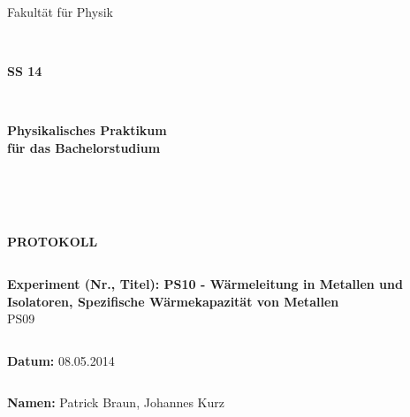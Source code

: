 \documentclass[12pt,a4paper]{article}
\begin{document}
\thispagestyle{empty}
			\begin{center}
			\Large{Fakultät für Physik}\\
			\end{center}
\begin{verbatim}


\end{verbatim}
			\begin{center}
			\textbf{\LARGE SS 14}
			\end{center}
\begin{verbatim}


\end{verbatim}
			\begin{center}
			\textbf{\LARGE{Physikalisches Praktikum\\ für das Bachelorstudium}}
			\end{center}
\begin{verbatim}




\end{verbatim}

			\begin{center}
			\textbf{\LARGE{PROTOKOLL}}
			\end{center}
			
\begin{verbatim}

\end{verbatim}

			\begin{flushleft}
			\textbf{\Large{Experiment (Nr., Titel): PS10 - Wärmeleitung in Metallen und Isolatoren, Spezifische Wärmekapazität von Metallen}}\\
			\LARGE{PS09 }	
			\end{flushleft}

\begin{verbatim}

\end{verbatim}	
			\begin{flushleft}
			\textbf{\Large{Datum:}} \Large{08.05.2014}
			\end{flushleft}
			
\begin{verbatim}
\end{verbatim}
		\begin{flushleft}
			\textbf{\Large{Namen:}} \Large{Patrick Braun, Johannes Kurz}
			\end{flushleft}
\end{document}

